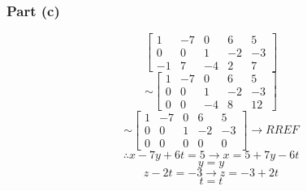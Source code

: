 \documentclass{report}
\begin{document}
\subsubsection*{Part (c)}
\begin{equation}
\begin{bmatrix}
1 & -7 & 0 & 6 & 5 \\ 
0 & 0 & 1 & -2 & -3 \\ 
-1 & 7 & -4 & 2 & 7
\end{bmatrix}
\end{equation}
\begin{equation}
\sim
\begin{bmatrix}
1 & -7 & 0 & 6 & 5 \\ 
0 & 0 & 1 & -2 & -3 \\ 
0 & 0 & -4 & 8 & 12
\end{bmatrix}
\end{equation}
\begin{equation}
\sim
\begin{bmatrix}
1 & -7 & 0 & 6 & 5 \\ 
0 & 0 & 1 & -2 & -3 \\ 
0 & 0 & 0 & 0 & 0
\end{bmatrix}
\rightarrow
RREF
\end{equation}
\begin{equation*}
\therefore
x-7y+6t=5
\rightarrow
x=5+7y-6t
\end{equation*}
\begin{equation*}
y=y
\end{equation*}
\begin{equation*}
z-2t=-3
\rightarrow
z=-3+2t
\end{equation*}
\begin{equation*}
t=t
\end{equation*}
\end{document}
